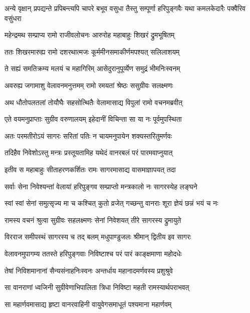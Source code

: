 \threelineshloka
{अन्ये वृक्षान् प्रपद्यन्ते प्रपिबन्त्यपि चापरे}
{बभूव वसुधा तैस्तु सम्पूर्णा हरिपुङ्गवैः}
{यथा कमलकेदारैः पक्वैरिव वसुंधरा} %

\twolineshloka
{महेन्द्रमथ सम्प्राप्य रामो राजीवलोचनः}
{आरुरोह महाबाहुः शिखरं द्रुमभूषितम्} %

\twolineshloka
{ततः शिखरमारुह्य रामो दशरथात्मजः}
{कूर्ममीनसमाकीर्णमपश्यत् सलिलाशयम्} %

\twolineshloka
{ते सह्यं समतिक्रम्य मलयं च महागिरिम्}
{आसेदुरानुपूर्व्येण समुद्रं भीमनिःस्वनम्} %

\twolineshloka
{अवरुह्य जगामाशु वेलावनमनुत्तमम्}
{रामो रमयतां श्रेष्ठः ससुग्रीवः सलक्ष्मणः} %

\twolineshloka
{अथ धौतोपलतलां तोयौघैः सहसोत्थितैः}
{वेलामासाद्य विपुलां रामो वचनमब्रवीत्} %

\twolineshloka
{एते वयमनुप्राप्ताः सुग्रीव वरुणालयम्}
{इहेदानीं विचिन्ता सा या नः पूर्वमुपस्थिता} %

\twolineshloka
{अतः परमतीरोऽयं सागरः सरितां पतिः}
{न चायमनुपायेन शक्यस्तरितुमर्णवः} %

\twolineshloka
{तदिहैव निवेशोऽस्तु मन्त्रः प्रस्तूयतामिह}
{यथेदं वानरबलं परं पारमवाप्नुयात्} %

\twolineshloka
{इतीव स महाबाहुः सीताहरणकर्शितः}
{रामः सागरमासाद्य वासमाज्ञापयत् तदा} %

\twolineshloka
{सर्वाः सेना निवेश्यन्तां वेलायां हरिपुङ्गव}
{सम्प्राप्तो मन्त्रकालो नः सागरस्येह लङ्घने} %

\twolineshloka
{स्वां स्वां सेनां समुत्सृज्य मा च कश्चित् कुतो व्रजेत्}
{गच्छन्तु वानराः शूरा ज्ञेयं छन्नं भयं च नः} %

\twolineshloka
{रामस्य वचनं श्रुत्वा सुग्रीवः सहलक्ष्मणः}
{सेनां निवेशयत् तीरे सागरस्य द्रुमायुते} %

\twolineshloka
{विरराज समीपस्थं सागरस्य च तद् बलम्}
{मधुपाण्डुजलः श्रीमान् द्वितीय इव सागरः} %

\twolineshloka
{वेलावनमुपागम्य ततस्ते हरिपुङ्गवाः}
{निविष्टाश्च परं पारं काङ्क्षमाणा महोदधेः} %

\twolineshloka
{तेषां निविशमानानां सैन्यसंनाहनिःस्वनः}
{अन्तर्धाय महानादमर्णवस्य प्रशुश्रुवे} %

\twolineshloka
{सा वानराणां ध्वजिनी सुग्रीवेणाभिपालिता}
{त्रिधा निविष्टा महती रामस्यार्थपराभवत्} %

\twolineshloka
{सा महार्णवमासाद्य हृष्टा वानरवाहिनी}
{वायुवेगसमाधूतं पश्यमाना महार्णवम्} %

